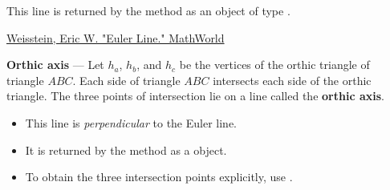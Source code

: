 \noindent
This line is returned by the method  as an object of type .
\begin{flushright}
\small
\href{https://mathworld.wolfram.com/EulerLine.html}{Weisstein, Eric W. "Euler Line." MathWorld}
\end{flushright}

\medskip
\noindent
\textbf{Orthic axis} — Let $h_a$, $h_b$, and $h_c$ be the vertices of the orthic triangle of triangle $ABC$. Each side of triangle $ABC$ intersects each side of the orthic triangle. The three points of intersection lie on a line called the \textbf{orthic axis}.

\begin{itemize}
  \item This line is \emph{perpendicular} to the Euler line.
  \item It is returned by the method  as a  object.
  \item To obtain the three intersection points explicitly, use .
\end{itemize}


\vspace{1em}

